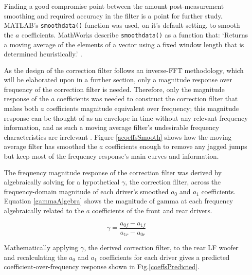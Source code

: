 \documentclass{report}
\begin{document}
            Finding a good compromise point between the amount post-measurement smoothing and required accuracy in the filter is a point for further study.
            MATLAB's \texttt{smoothdata()} function was used, on it's default setting, to smooth the $a$ coefficients.
            MathWorks describe \texttt{smoothdata()} as a function that: `Returns a moving average of the elements of a vector using a fixed window length that is determined heuristically.' \cite{smoothdata}.

            As the design of the correction filter follows an inverse-FFT methodology, which will be elaborated upon in a further section, only a magnitude response over frequency of the correction filter is needed.
            Therefore, only the magnitude response of the $a$ coefficients was needed to construct the correction filter that makes both $a$ coefficients magnitude equivalent over frequency; this magnitude response can be thought of as an envelope in time without any relevant frequency information, and as such a moving average filter's undesirable frequency characteristics are irrelevant \cite{smith2013digital}.
            Figure \ref{acoeffsSmooth} shows how the moving-average filter has smoothed the $a$ coefficients enough to remove any jagged jumps but keep most of the frequency response's main curves and information.

            The frequency magnitude response of the correction filter was derived by algebraically solving for a hypothetical $\gamma$, the correction filter, across the frequency-domain magnitude of each driver's smoothed $a_0$ and $a_1$ coefficients.
            Equation \ref{gammaAlgebra} shows the magnitude of gamma at each frequency algebraically related to the $a$ coefficients of the front and rear drivers.

            \begin{equation}
                \gamma = \frac{a_{0f} - a_{1f}}{a_{1r} - a_{0r}}
                \label{gammaAlgebra}
            \end{equation}

            Mathematically applying $\gamma$, the derived correction filter, to the rear LF woofer and recalculating the $a_0$ and $a_1$ coefficients for each driver gives a predicted coefficient-over-frequency response shown in Fig.\ref{coeffsPredicted}.
\end{document}
